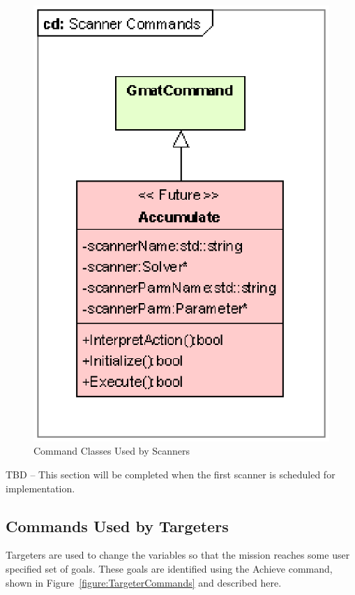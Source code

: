 \begin{figure}[htb]
\begin{center}
\includegraphics[scale=0.5]{Images/ScannerCommands.eps}
\caption{\label{figure:ScannerCommands}Command Classes Used by Scanners}
\end{center}
\end{figure}

TBD -- This section will be completed when the first scanner is scheduled for implementation.

\subsection{Commands Used by Targeters}

Targeters are used to change the variables so that the mission reaches some user specified set of
goals.  These goals are identified using the Achieve command, shown in
Figure~\ref{figure:TargeterCommands} and described here.

